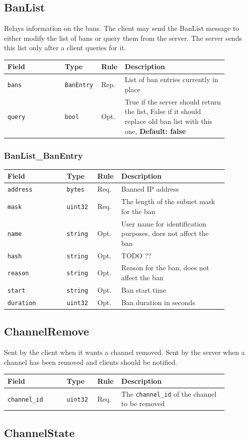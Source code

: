 \documentclass[11pt]{article} %
\newenvironment{mumbleMessageEx}
{%
	\small
	\renewcommand\arraystretch{1.5}
	\begin{tabular}{p{0.25\linewidth}p{0.13\linewidth}p{0.05\linewidth}p{0.45\linewidth}}
	Field & Type & Rule & Description \\
	\hline
}
{%
	\end{tabular}
	\renewcommand\arraystretch{1.0}
}
\newcommand{\mumbleMessageExItem}[4]{ \texttt{#1} & \texttt{#2} & #3 & #4 \\ }
\begin{document}
\subsection{BanList} 
\label{msg:banList}

Relays information on the bans. The client may send the BanList message to either modify the list of bans or query them from the server. The server sends this list only after a client queries for it.

\begin{mumbleMessageEx}
\mumbleMessageExItem{bans}{BanEntry}{Rep.}{List of ban entries currently in place}
\mumbleMessageExItem{query}{bool}{Opt.}{True if the server should return the list, False if it should replace old ban list with this one, \textbf{Default: false}}
\end{mumbleMessageEx}

\subsubsection{BanList\_BanEntry}
\label{msg:banEntry}

\begin{mumbleMessageEx}
\mumbleMessageExItem{address}{bytes}{Req.}{Banned IP address}
\mumbleMessageExItem{mask}{uint32}{Req.}{The length of the subnet mask for the ban}
\mumbleMessageExItem{name}{string}{Opt.}{User name for identification purposes, does not affect the ban}
\mumbleMessageExItem{hash}{string}{Opt.}{TODO ??}
\mumbleMessageExItem{reason}{string}{Opt.}{Reason for the ban, does not affect the ban}
\mumbleMessageExItem{start}{string}{Opt.}{Ban start time}
\mumbleMessageExItem{duration}{uint32}{Opt.}{Ban duration in seconds}
\end{mumbleMessageEx}

\subsection{ChannelRemove}
\label{msg:channelRemove}

Sent by the client when it wants a channel removed. Sent by the server when a channel has been removed and clients should be notified.

\begin{mumbleMessageEx}
\mumbleMessageExItem{channel\_id}{uint32}{Req.}{The \texttt{channel\_id} of the channel to be removed}
\end{mumbleMessageEx}

\subsection{ChannelState}
\label{msg:channelState}
\end{document}
